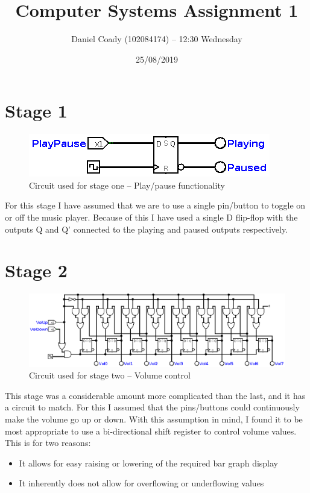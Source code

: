 \documentclass[11pt]{scrartcl}
\title{Computer Systems Assignment 1}
\author{Daniel Coady (102084174) -- 12:30 Wednesday}
\date{25/08/2019}
\begin{document}
\maketitle

\pagebreak

\section*{Stage 1}
\begin{figure}[h]
    \centering
    \includegraphics[scale=0.5]{images/stageone.png}
    \caption{Circuit used for stage one -- Play/pause functionality}
\end{figure}
For this stage I have assumed that we are to use a single pin/button to toggle on or off
the music player. Because of this I have used a single D flip-flop with the outputs Q and
Q' connected to the playing and paused outputs respectively.

\section*{Stage 2}
\begin{figure}[h]
    \centering
    \includegraphics[scale=0.372]{images/stagetwo.png}
    \caption{Circuit used for stage two -- Volume control}
\end{figure}
This stage was a considerable amount more complicated than the last, and it has a circuit
to match. For this I assumed that the pins/buttons could continuously make the volume go
up or down. With this assumption in mind, I found it to be most appropriate to use a
bi-directional shift register to control volume values. This is for two reasons:

\begin{itemize}
    \item It allows for easy raising or lowering of the required bar graph display
    \item It inherently does not allow for overflowing or underflowing values
\end{itemize}
\end{document}

